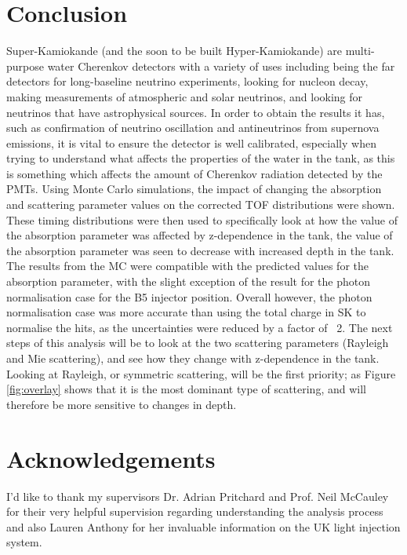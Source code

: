 \documentclass[11pt,oneside,a4paper]{article}
\begin{document}
\section{Conclusion}
Super-Kamiokande (and the soon to be built Hyper-Kamiokande) are multi-purpose water Cherenkov detectors with a variety of uses including being the far detectors for long-baseline neutrino experiments, looking for nucleon decay, making measurements of atmospheric and solar neutrinos, and looking for neutrinos that have astrophysical sources. In order to obtain the results it has, such as confirmation of neutrino oscillation and antineutrinos from supernova emissions, it is vital to ensure the detector is well calibrated, especially when trying to understand what affects the properties of the water in the tank, as this is something which affects the amount of Cherenkov radiation detected by the PMTs. Using Monte Carlo simulations, the impact of changing the absorption and scattering parameter values on the corrected TOF distributions were shown. These timing distributions were then used to specifically look at how the value of the absorption parameter was affected by z-dependence in the tank, the value of the absorption parameter was seen to decrease with increased depth in the tank. The results from the MC were compatible with the predicted values for the absorption parameter, with the slight exception of the result for the photon normalisation case for the B5 injector position. Overall however, the photon normalisation case was more accurate than using the total charge in SK to normalise the hits, as the uncertainties were reduced by a factor of ~2. The next steps of this analysis will be to look at the two scattering parameters (Rayleigh and Mie scattering), and see how they change with z-dependence in the tank. Looking at Rayleigh, or symmetric scattering, will be the first priority; as Figure \ref{fig:overlay} shows that it is the most dominant type of scattering, and will therefore be more sensitive to changes in depth. 
\newpage
\section{Acknowledgements}

I'd like to thank my supervisors Dr. Adrian Pritchard and Prof. Neil McCauley for their very helpful supervision regarding understanding the analysis process and also Lauren Anthony for her invaluable information on the UK light injection system.





 
	
	
	
	
	
	
	
	
	
	
	
	
	
	
	
	
	
	
	
	
	
	
	
	
	
	
	
	
	
	
\newpage	
 
	
	
\end{document}
